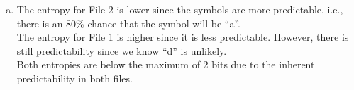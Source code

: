 \documentclass[12pt]{article}
\begin{document}
{\begin{minipage}[t]{0.98\textwidth}
\begin{enumerate}[a)]
\begin{center}
\begin{tabular}{|c|cccc|}
\hline
\multicolumn{5}{c}{}\\[-0.8cm]
\end{tabular}
\end{center}
\begin{align*}
H(X) = E[h(X)] = \sum h(x_i)\,p(x_i) &=  3.322(0.1) + 0.322(0.8) + 4.322(0.05) + 4.322(0.05) \\[0.1cm]
&=  0.332 + 0.258 + 0.216 + 0.216 \\[0.1cm]
&= 1.02 \text{ bits}
\end{align*}
\item The entropy for File 2 is lower since the symbols are more predictable, i.e., there is an 80\% chance that the symbol will be ``a''.\\[0.3cm]
    The entropy for File 1 is higher since it is less predictable. However, there is still predictability since we know ``d'' is unlikely.\\[0.3cm]
    Both entropies are below the maximum of 2 bits due to the inherent predictability in both files.
\end{enumerate}
\end{minipage}}\vspace{0.03\textwidth}
\end{document}
